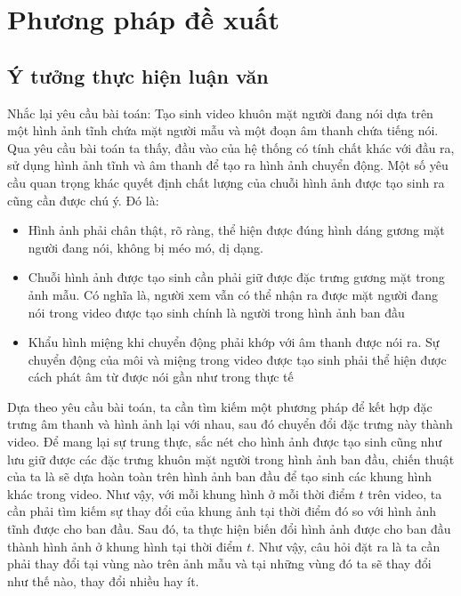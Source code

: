 \chapter{Phương pháp đề xuất}

\section{Ý tưởng thực hiện luận văn}

Nhắc lại yêu cầu bài toán: Tạo sinh video khuôn mặt người đang nói dựa trên một hình ảnh tĩnh chứa mặt người mẫu và một đoạn âm thanh chứa tiếng nói. Qua yêu cầu bài toán ta thấy, đầu vào của hệ thống có tính chất khác với đầu ra, sử dụng hình ảnh tĩnh và âm thanh để tạo ra hình ảnh chuyển động. Một số yêu cầu quan trọng khác quyết định chất lượng của chuỗi hình ảnh được tạo sinh ra cũng cần được chú ý. Đó là:
\begin{itemize}
    \item Hình ảnh phải chân thật, rõ ràng, thể hiện được đúng hình dáng gương mặt người đang nói, không bị méo mó, dị dạng.
    \item Chuỗi hình ảnh được tạo sinh cần phải giữ được đặc trưng gương mặt trong ảnh mẫu. Có nghĩa là, người xem vẫn có thể nhận ra được mặt người đang nói trong video được tạo sinh chính là người trong hình ảnh ban đầu
    \item Khẩu hình miệng khi chuyển động phải khớp với âm thanh được nói ra. Sự chuyển động của môi và miệng trong video được tạo sinh phải thể hiện được cách phát âm từ được nói gần như trong thực tế
\end{itemize}

Dựa theo yêu cầu bài toán, ta cần tìm kiếm một phương pháp để kết hợp đặc trưng âm thanh và hình ảnh lại với nhau, sau đó chuyển đổi đặc trưng này thành video. Để mang lại sự trung thực, sắc nét cho hình ảnh được tạo sinh cũng như lưu giữ được các đặc trưng khuôn mặt người trong hình ảnh ban đầu, chiến thuật của ta là sẽ dựa hoàn toàn trên hình ảnh ban đầu để tạo sinh các khung hình khác trong video. Như vậy, với mỗi khung hình ở mỗi thời điểm $t$ trên video, ta cần phải tìm kiếm sự thay đổi của khung ảnh tại thời điểm đó so với hình ảnh tĩnh được cho ban đầu. Sau đó, ta thực hiện biến đổi hình ảnh được cho ban đầu thành hình ảnh ở khung hình tại thời điểm $t$. Như vậy, câu hỏi đặt ra là ta cần phải thay đổi tại vùng nào trên ảnh mẫu và tại những vùng đó ta sẽ thay đổi như thế nào, thay đổi nhiều hay ít.

